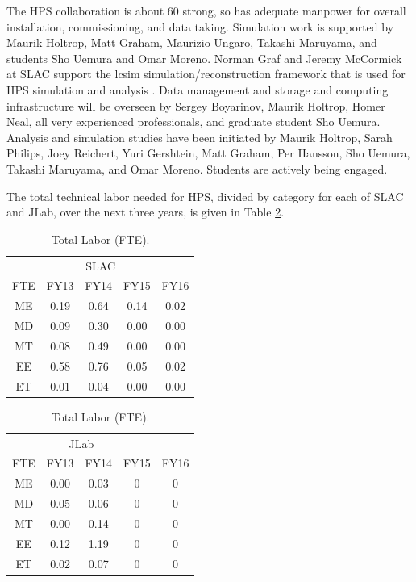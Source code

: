 The HPS collaboration is about 60 strong, so has adequate manpower for overall installation, commissioning, and data taking. Simulation work is supported by Maurik Holtrop, 
Matt Graham, Maurizio Ungaro, Takashi Maruyama, and students Sho Uemura and Omar Moreno. Norman Graf and Jeremy McCormick at SLAC support the lcsim 
simulation/reconstruction framework that is used for HPS simulation and analysis . Data management and storage and computing infrastructure will be overseen by 
Sergey Boyarinov, Maurik Holtrop, Homer Neal, all very experienced professionals, and graduate student Sho Uemura. Analysis and simulation studies have been 
initiated by Maurik Holtrop, Sarah Philips, Joey Reichert, Yuri Gershtein, Matt Graham, Per Hansson, Sho Uemura, Takashi Maruyama, and Omar Moreno. 
Students are actively being engaged.

The total technical labor needed for HPS, divided by category for each of SLAC and JLab, over the next three years, is given in Table \ref{tb:engin}.

\begin{table}[htdp]
\caption{Total Labor (FTE).}
\begin{center}
\parbox{.45\linewidth}{
\begin{tabular}{c||cccc}
\multicolumn{5}{c}{SLAC}\\
 FTE	&FY13	&FY14	&FY15&	FY16\\
 \hline\hline
ME	&0.19	&0.64&	0.14&	0.02\\
MD&	0.09	&0.30&	0.00&	0.00\\
MT&	0.08	&0.49&	0.00	&0.00\\
EE &	0.58	&0.76&	0.05	&0.02\\
ET&	0.01	&0.04&	0.00	&0.00\\
\end{tabular}
}
\parbox{.45\linewidth}{
\begin{tabular}{c||cccc}
\multicolumn{4}{c}{JLab}\\
 FTE	&FY13	&FY14	&	FY15&FY16\\
 \hline\hline
ME	&0.00	&0.03&	0&0 \\
MD&	0.05	&0.06&	0 &0\\
MT&	0.00	&0.14& 0&0\\
EE &	0.12	&1.19&0&0\\
ET&	0.02	&0.07&0&0\\
\end{tabular}
}
\end{center}
\label{tb:engin}
\end{table}%

